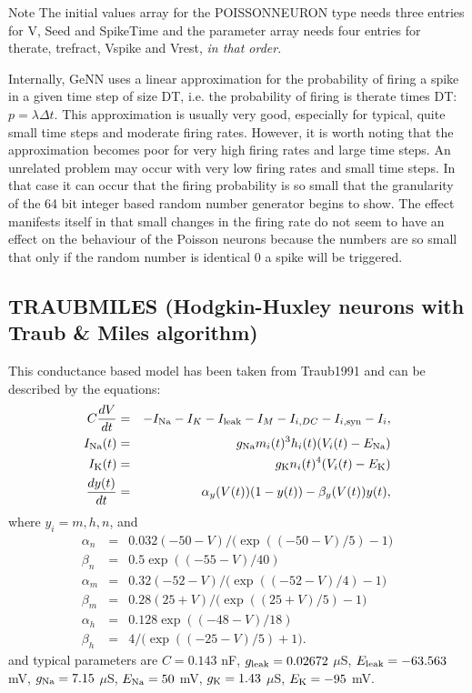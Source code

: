 \begin{DoxyNote}{Note}
The initial values array for the {\ttfamily P\+O\+I\+S\+S\+O\+N\+N\+E\+U\+R\+O\+N} type needs three entries for {\ttfamily V}, {\ttfamily Seed} and {\ttfamily Spike\+Time} and the parameter array needs four entries for {\ttfamily therate}, {\ttfamily trefract}, {\ttfamily Vspike} and {\ttfamily Vrest}, {\itshape in that order}.

Internally, Ge\+N\+N uses a linear approximation for the probability of firing a spike in a given time step of size {\ttfamily D\+T}, i.\+e. the probability of firing is {\ttfamily therate} times {\ttfamily D\+T}\+: $ p = \lambda \Delta t $. This approximation is usually very good, especially for typical, quite small time steps and moderate firing rates. However, it is worth noting that the approximation becomes poor for very high firing rates and large time steps. An unrelated problem may occur with very low firing rates and small time steps. In that case it can occur that the firing probability is so small that the granularity of the 64 bit integer based random number generator begins to show. The effect manifests itself in that small changes in the firing rate do not seem to have an effect on the behaviour of the Poisson neurons because the numbers are so small that only if the random number is identical 0 a spike will be triggered.
\end{DoxyNote}
\hypertarget{sect2_sect23}{}\subsection{T\+R\+A\+U\+B\+M\+I\+L\+E\+S (\+Hodgkin-\/\+Huxley neurons with Traub \& Miles algorithm)}\label{sect2_sect23}
This conductance based model has been taken from Traub1991 and can be described by the equations\+: \begin{eqnarray*} C \frac{d V}{dt} &=& -I_{{\rm Na}} -I_K-I_{{\rm leak}}-I_M-I_{i,DC}-I_{i,{\rm syn}}-I_i, \\ I_{{\rm Na}}(t) &=& g_{{\rm Na}} m_i(t)^3 h_i(t)(V_i(t)-E_{{\rm Na}}) \\ I_{{\rm K}}(t) &=& g_{{\rm K}} n_i(t)^4(V_i(t)-E_{{\rm K}}) \\ \frac{dy(t)}{dt} &=& \alpha_y (V(t))(1-y(t))-\beta_y(V(t)) y(t), \end{eqnarray*} where $y_i= m, h, n$, and \begin{eqnarray*} \alpha_n&=& 0.032(-50-V)/\big(\exp((-50-V)/5)-1\big) \\ \beta_n &=& 0.5\exp((-55-V)/40) \\ \alpha_m &=& 0.32(-52-V)/\big(\exp((-52-V)/4)-1\big) \\ \beta_m &=& 0.28(25+V)/\big(\exp((25+V)/5)-1\big) \\ \alpha_h &=& 0.128\exp((-48-V)/18) \\ \beta_h &=& 4/\big(\exp((-25-V)/5)+1\big). \end{eqnarray*} and typical parameters are $C=0.143$ n\+F, $g_{{\rm leak}}= 0.02672$ $\mu$S, $E_{{\rm leak}}= -63.563$ m\+V, $g_{{\rm Na}}=7.15$ $\mu$S, $E_{{\rm Na}}= 50$ m\+V, $g_{{\rm {\rm K}}}=1.43$ $\mu$S, $E_{{\rm K}}= -95$ m\+V.

